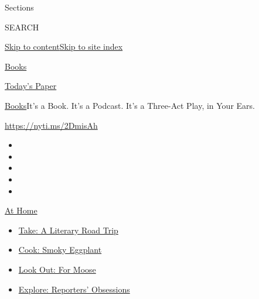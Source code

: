 Sections

SEARCH

\protect\hyperlink{site-content}{Skip to
content}\protect\hyperlink{site-index}{Skip to site index}

\href{https://www.nytimes3xbfgragh.onion/section/books}{Books}

\href{https://myaccount.nytimes3xbfgragh.onion/auth/login?response_type=cookie\&client_id=vi}{}

\href{https://www.nytimes3xbfgragh.onion/section/todayspaper}{Today's
Paper}

\href{/section/books}{Books}\textbar{}It's a Book. It's a Podcast. It's
a Three-Act Play, in Your Ears.

\url{https://nyti.ms/2DmisAh}

\begin{itemize}
\item
\item
\item
\item
\item
\end{itemize}

\href{https://www.nytimes3xbfgragh.onion/spotlight/at-home?action=click\&pgtype=Article\&state=default\&region=TOP_BANNER\&context=at_home_menu}{At
Home}

\begin{itemize}
\tightlist
\item
  \href{https://www.nytimes3xbfgragh.onion/2020/07/28/books/time-for-a-literary-road-trip.html?action=click\&pgtype=Article\&state=default\&region=TOP_BANNER\&context=at_home_menu}{Take:
  A Literary Road Trip}
\item
  \href{https://www.nytimes3xbfgragh.onion/2020/07/29/magazine/bored-with-your-home-cooking-some-smoky-eggplant-will-fix-that.html?action=click\&pgtype=Article\&state=default\&region=TOP_BANNER\&context=at_home_menu}{Cook:
  Smoky Eggplant}
\item
  \href{https://www.nytimes3xbfgragh.onion/2020/07/27/travel/moose-michigan-isle-royale.html?action=click\&pgtype=Article\&state=default\&region=TOP_BANNER\&context=at_home_menu}{Look
  Out: For Moose}
\item
  \href{https://www.nytimes3xbfgragh.onion/interactive/2020/at-home/even-more-reporters-editors-diaries-lists-recommendations.html?action=click\&pgtype=Article\&state=default\&region=TOP_BANNER\&context=at_home_menu}{Explore:
  Reporters' Obsessions}
\end{itemize}

